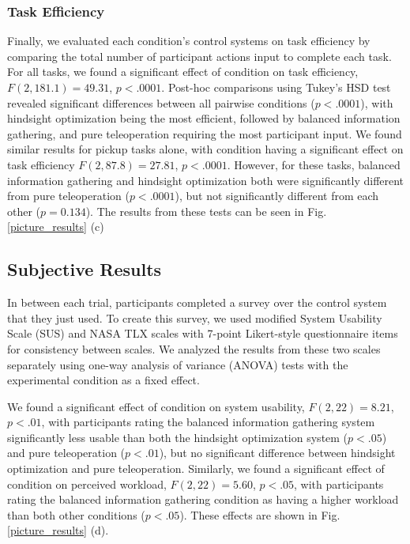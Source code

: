 \documentclass[conference]{IEEEtran}
\begin{document}
\subsubsection{Task Efficiency}

Finally, we evaluated each condition's control systems on task efficiency by comparing the total number of participant actions input to complete each task. For all tasks, we found a significant effect of condition on task efficiency, $F(2, 181.1) = 49.31$, $p < .0001$. Post-hoc comparisons using Tukey's HSD test revealed significant differences between all pairwise conditions ($p < .0001$), with hindsight optimization being the most efficient, followed by balanced information gathering, and pure teleoperation requiring the most participant input. We found similar results for pickup tasks alone, with condition having a significant effect on task efficiency $F(2, 87.8) = 27.81$, $p < .0001$. However, for these tasks, balanced information gathering and hindsight optimization both were significantly different from pure teleoperation ($p < .0001$), but not significantly different from each other ($p = 0.134$). The results from these tests can be seen in Fig. \ref{picture_results} (c)

\begin{figure*}
\caption{This figure shows the results of the ANOVA tests on our results. Part (a) contains the tests on efficiency of belief gain after shared autonomy control, Part (b) contains the tests on speed of gaining dominant proper belief, Part (c) contains the tests on task efficiency, and Part (d) contains results from our subjective measures}
\label{picture_results}
\end{figure*}

\subsection{Subjective Results}

In between each trial, participants completed a survey over the control system that they just used. To create this survey, we used modified System Usability Scale (SUS) and NASA TLX scales with 7-point Likert-style questionnaire items for consistency between scales. We analyzed the results from these two scales separately using one-way analysis of variance (ANOVA) tests with the experimental condition as a fixed effect.

We found a significant effect of condition on system usability, $F(2, 22) = 8.21$, $p < .01$, with participants rating the balanced information gathering system significantly less usable than both the hindsight optimization system ($p < .05$) and pure teleoperation ($p < .01$), but no significant difference between hindsight optimization and pure teleoperation. Similarly, we found a significant effect of condition on perceived workload, $F(2, 22) = 5.60$, $p < .05$, with participants rating the balanced information gathering condition as having a higher workload than both other conditions ($p < .05$). These effects are shown in Fig. \ref{picture_results} (d).
\end{document}
